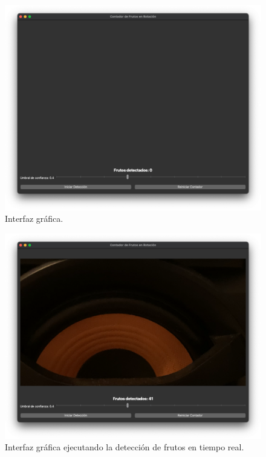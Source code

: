 \documentclass[conference]{IEEEtran}
\begin{document}
\begin{figure}[ht]
    \centering
    \includegraphics[width=\columnwidth]{images/UI.png}
    \caption{Interfaz gráfica.}
    \label{fig:interfaz}
\end{figure}

\begin{figure}[ht]
    \centering
    \includegraphics[width=\columnwidth]{images/UI-ejecutando.png}
    \caption{Interfaz gráfica ejecutando la detección de frutos en tiempo real.}
    \label{fig:interfaz-ejecutando}
\end{figure}
\end{document}
